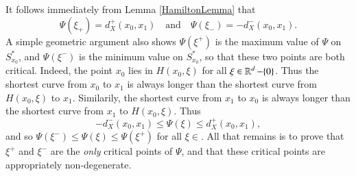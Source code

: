 %






It follows immediately from Lemma \ref{HamiltonLemma} that
%
\begin{equation}
    \Psi(\xi_+) = d_X^+(x_0,x_1) \quad\text{and}\quad \Psi(\xi_-) = - d_X^-(x_0,x_1).
\end{equation}
%
A simple geometric argument also shows $\Psi(\xi^+)$ is the maximum value of $\Psi$ on $S_{x_0}^*$, and $\Psi(\xi^-)$ is the minimum value on $S_{x_0}^*$, so that these two points are both critical. Indeed, the point $x_0$ lies in $H(x_0,\xi)$ for all $\xi \in \operatorname{\mathbb{R}}^d - \{ 0 \}$. Thus the shortest curve from $x_0$ to $x_1$ is always longer than the shortest curve from $H(x_0,\xi)$ to $x_1$. Similarily, the shortest curve from $x_1$ to $x_0$ is always longer than the shortest curve from $x_1$ to $H(x_0,\xi)$. Thus
%
\begin{equation}
    - d_X^-(x_0,x_1) \leq \Psi(\xi) \leq d_X^+(x_0,x_1),
\end{equation}
%
and so $\Psi(\xi^-) \leq \Psi(\xi) \leq \Psi(\xi^+)$ for all $\xi \in $. All that remains is to prove that $\xi^+$ and $\xi^-$ are the \emph{only} critical points of $\Psi$, and that these critical points are appropriately non-degenerate.

